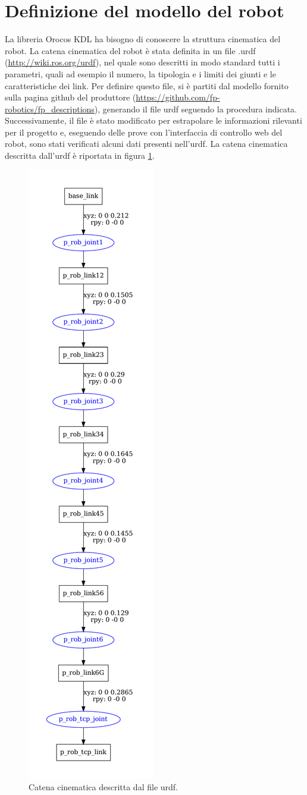 \section{Definizione del modello del robot}
La libreria Orocos KDL ha bisogno di conoscere la struttura cinematica del robot. La catena cinematica del robot è stata definita in un file .urdf (\url{http://wiki.ros.org/urdf}), nel quale sono descritti in modo standard tutti i parametri, quali ad esempio il numero, la tipologia e i limiti dei giunti e le caratteristiche dei link. Per definire questo file, si è partiti dal modello fornito sulla pagina github del produttore (\url{https://github.com/fp-robotics/fp_descriptions}), generando il file urdf seguendo la procedura indicata. Successivamente, il file è stato modificato per estrapolare le informazioni rilevanti per il progetto e, eseguendo delle prove con l'interfaccia di controllo web del robot, sono stati verificati alcuni dati presenti nell'urdf. La catena cinematica descritta dall'urdf è riportata in figura \ref{fig:urdf_prob3}.
\begin{figure}[tbh]
	\centering
	\includegraphics[width=0.3\linewidth]{./OtherFiles/p_rob.pdf}
	\caption{Catena cinematica descritta dal file urdf.}
	\label{fig:urdf_prob3}
\end{figure}

